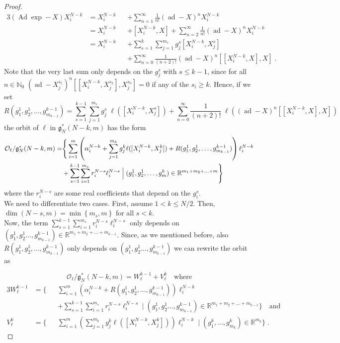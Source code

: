 \documentclass[pdflatex,sn-mathphys-num]{sn-jnl}
\theoremstyle{thmstyletwo}
\theoremstyle{thmstyleone}
\theoremstyle{thmstyletwo}
\newcommand{\fancyg}{\mathfrak{g}}
\newcommand{\Adjoint}{\operatorname{Ad}}
\begin{document}
\begin{proof}
\begin{alignat*}{3}
			(\Adjoint \operatorname{exp} - X)X_i^{N-k} 
			& = X_i^{N-k} 
			& & + \sum_{n=1}^{\infty} \frac{1}{n!} (\operatorname{ad} -X)^n X_i^{N-k} \\
			& = X_i^{N-k} 
			& &+ [X_i^{N-k}, X] 
			+ \sum_{n=2}^{\infty} \frac{1}{n!} (\operatorname{ad} -X)^n X_i^{N-k} \\
			& = X_i^{N-k} 
			&& + \sum_{s=1}^{k} \sum_{j=1}^{m_s} g_j^s [X_i^{N-k}, X_j^s] \\
			&& & + \sum_{n=0}^{\infty} \frac{1}{(n+2)!} (\operatorname{ad} -X)^n [[X_i^{N-k}, X], X] \;.
		\end{alignat*}
		Note that the very last sum only depends on the $g_j^s$ with $s \leq k-1$, since for all $n \in \mathbb{N}_0$ $(\operatorname{ad}-X_j^{s_1})^n [[X_i^{N-k}, X_j^{s_2}], X_j^{s_3}] = 0$ if any of the $s_i \geq k$. Hence, if we set
		\begin{equation*}
			R(g_1^1,g_2^1, \ldots, g_{m_{k-1}}^{k-1}) = \sum_{s=1}^{k-1} \sum_{j=1}^{m_s} g_j^s \; \ell([X_i^{N-k}, X_j^s]) + \sum_{n=0}^{\infty} \frac{1}{(n+2)!}\; \ell\left((\operatorname{ad} -X)^n [[X_i^{N-k}, X], X]\right)
		\end{equation*}
		the orbit of $\ell$ in $\fancyg_N^*(N-k, m)$ has the form
		\begin{align}\label{eq: korbit}
			\mathcal{O}_{\ell} / \fancyg_N^*(N-k, m) = &\Bigg\{ 
			\sum_{i=1}^{m} \left(\alpha_i^{N-k} + \sum_{j=1}^{m_k} g_j^k \ell([X_i^{N-k}, X_j^k]) + R(g_1^1,g_2^1, \ldots, g_{m_{k-1}}^{k-1})\right) \ell_i^{N-k} \notag \\
			& + \sum_{s = 1}^{k-1} \sum_{i=1}^{m_s} r_i^{N-s} \ell_i^{N-s} \; \Big| \; (g_1^1,g_2^1, \ldots, g_{m}^k) \in \mathbb{R}^{m_1+m_2+\ldots + m} \Bigg\}
		\end{align}
		where the $r_i^{N-s}$ are some real coefficients that depend on the $g_i^s$.\\
		We need to differentiate two cases. First, assume $1<k\leq N/2$. Then,
		$\operatorname{dim}(N-s,m) = \min\left\{m_s,m\right\}$ for all $s< k$.\\
		Now, the term
		$\sum_{s = 1}^{k-1} \sum_{i=1}^{m_s} r_i^{N-s} \ell_i^{N-s}$ only depends on $(g_1^1,g_2^1 \ldots, g_{m_{k-1}}^{k-1}) \in \mathbb{R}^{m_1+m_2+\ldots + m_{k-1}}$.
		Since, as we mentioned before, also $R(g_1^1,g_2^1, \ldots, g_{m_{k-1}}^{k-1})$ only depends on $(g_1^1,g_2^1 \ldots, g_{m_{k-1}}^{k-1})$ we can rewrite the orbit as
		
		\[\mathcal{O}_{\ell} / \fancyg_N^*(N - k, m) = W_{\ell}^{k-1} + V_{\ell}^k \quad \text{where}\]
		\begin{alignat*}{3}
			W_{\ell}^{k-1} &=  \Bigg\{
			&& \sum_{i=1}^{m} \left(\alpha_i^{N-k}+ R(g_1^1,g_2^1, \ldots, g_{m_{k-1}}^{k-1})\right) \ell_i^{N-k}\\
			&&& + \sum_{s = 1}^{k-1} \sum_{i=1}^{m_s} r_i^{N-s} \ell_i^{N-s} \; \Big| \; (g_1^1,g_2^1 \ldots, g_{m_{k-1}}^{k-1}) \in \mathbb{R}^{m_1+m_2+\ldots + m_{k-1}} \Bigg\} \quad \text{and} \\
			V_{\ell}^k &= \Bigg\{ 
			&&\sum_{i=1}^{m} \left(\sum_{j=1}^{m_k} g_j^k \ell([X_i^{N-k}, X_j^k])\right) \ell_i^{N-k} \; \Big| \; (g_1^k, \ldots, g_{m_k}^k) \in \mathbb{R}^{m_k} \Bigg\} \;.
		\end{alignat*}
		

\end{proof}
\end{document}
